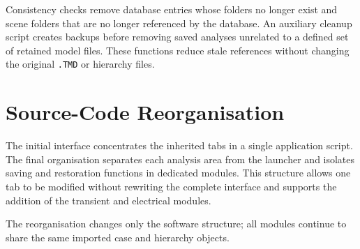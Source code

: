 

Consistency checks remove database entries whose folders no longer exist and
scene folders that are no longer referenced by the database. An auxiliary
cleanup script creates backups before removing saved analyses unrelated to a
defined set of retained model files. These functions reduce stale references
without changing the original \texttt{.TMD} or hierarchy files.

\section{Source-Code Reorganisation}
\label{appsec:source_code_reorganisation}

The initial interface concentrates the inherited tabs in a single application
script. The final organisation separates each analysis area from the launcher
and isolates saving and restoration functions in dedicated modules. This
structure allows one tab to be modified without rewriting the complete
interface and supports the addition of the transient and electrical modules.



The reorganisation changes only the software structure; all modules continue
to share the same imported case and hierarchy objects.

\FloatBarrier
